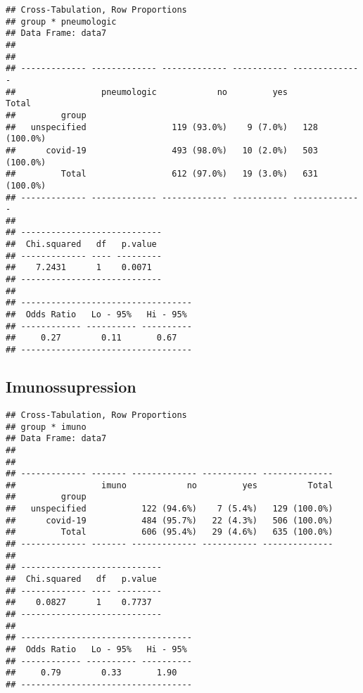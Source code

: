 \documentclass[
]{article}
\newenvironment{Shaded}{\begin{snugshade}}{\end{snugshade}}
\newcommand{\AttributeTok}[1]{\textcolor[rgb]{0.77,0.63,0.00}{#1}}
\newcommand{\ConstantTok}[1]{\textcolor[rgb]{0.00,0.00,0.00}{#1}}
\newcommand{\FunctionTok}[1]{\textcolor[rgb]{0.00,0.00,0.00}{#1}}
\newcommand{\NormalTok}[1]{#1}
\newcommand{\SpecialCharTok}[1]{\textcolor[rgb]{0.00,0.00,0.00}{#1}}
\newcommand{\StringTok}[1]{\textcolor[rgb]{0.31,0.60,0.02}{#1}}
\begin{document}
\begin{verbatim}
## Cross-Tabulation, Row Proportions  
## group * pneumologic  
## Data Frame: data7  
## 
## 
## ------------- ------------- ------------- ----------- --------------
##                 pneumologic            no         yes          Total
##         group                                                       
##   unspecified                 119 (93.0%)    9 (7.0%)   128 (100.0%)
##      covid-19                 493 (98.0%)   10 (2.0%)   503 (100.0%)
##         Total                 612 (97.0%)   19 (3.0%)   631 (100.0%)
## ------------- ------------- ------------- ----------- --------------
## 
## ----------------------------
##  Chi.squared   df   p.value 
## ------------- ---- ---------
##    7.2431      1    0.0071  
## ----------------------------
## 
## ----------------------------------
##  Odds Ratio   Lo - 95%   Hi - 95% 
## ------------ ---------- ----------
##     0.27        0.11       0.67   
## ----------------------------------
\end{verbatim}

\hypertarget{imunossupression}{%
\subsection{Imunossupression}\label{imunossupression}}

\begin{Shaded}
\end{Shaded}

\begin{verbatim}
## Cross-Tabulation, Row Proportions  
## group * imuno  
## Data Frame: data7  
## 
## 
## ------------- ------- ------------- ----------- --------------
##                 imuno            no         yes          Total
##         group                                                 
##   unspecified           122 (94.6%)    7 (5.4%)   129 (100.0%)
##      covid-19           484 (95.7%)   22 (4.3%)   506 (100.0%)
##         Total           606 (95.4%)   29 (4.6%)   635 (100.0%)
## ------------- ------- ------------- ----------- --------------
## 
## ----------------------------
##  Chi.squared   df   p.value 
## ------------- ---- ---------
##    0.0827      1    0.7737  
## ----------------------------
## 
## ----------------------------------
##  Odds Ratio   Lo - 95%   Hi - 95% 
## ------------ ---------- ----------
##     0.79        0.33       1.90   
## ----------------------------------
\end{verbatim}
\end{document}

